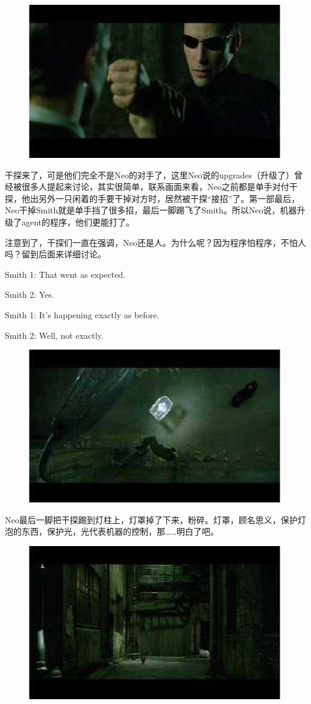 \documentclass{ctexart}
\newenvironment{myquote}{\color{green} \setlength{\leftskip}{6em} \setlength{\rightskip}{4em} \setlength{\parindent}{-2em}}{\par}
\begin{document}
\begin{figure}[htb]
\centering
\includegraphics[width=0.5\linewidth]{fig/read_reloaded-22}
\end{figure}

干探来了，可是他们完全不是Neo的对手了，这里Neo说的upgrades（升级了）曾经被很多人提起来讨论，其实很简单，联系画面来看，Neo之前都是单手对付干探，他出另外一只闲着的手要干掉对方时，居然被干探“接招”了。第一部最后，Neo干掉Smith就是单手挡了很多招，最后一脚踢飞了Smith。所以Neo说，机器升级了agent的程序，他们更能打了。

注意到了，干探们一直在强调，Neo还是人。为什么呢？因为程序怕程序，不怕人吗？留到后面来详细讨论。

\begin{myquote}
Smith 1: That went as expected.

Smith 2: Yes.

Smith 1: It's happening exactly as before.

Smith 2: Well, not exactly.
\end{myquote}

\begin{figure}[htb]
\centering
\includegraphics[width=0.5\linewidth]{fig/read_reloaded-23}
\end{figure}

Neo最后一脚把干探踢到灯柱上，灯罩掉了下来，粉碎。灯罩，顾名思义，保护灯泡的东西，保护光，光代表机器的控制，那……明白了吧。

\begin{figure}[htb]
\centering
\includegraphics[width=0.5\linewidth]{fig/read_reloaded-24}
\end{figure}
\end{document}
